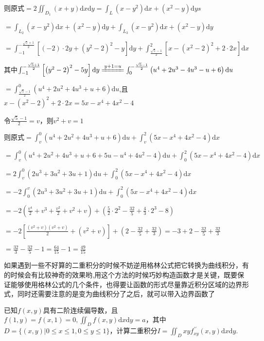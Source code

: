 \begin{xiti}
\begin{solution}
		则原式$=2 \iint_{D_{1}}(x+y) \mathrm{d} x \mathrm{d} y= \int_{L} (x-y^{2}) \mathrm{d} x + (x^{2}-y) \mathrm{d} ys$
		
		$=\int_{L_{2}}\left(x-y^{2}\right) \mathrm{d}x+\left(x^{2}-y\right) \mathrm{d}y+\int_{L_{3}}\left(x-y^{2}\right) \mathrm{d}x+\left(x^{2}-y\right) \mathrm{d}y $
		
		$=\int_{-1}^{-\frac{\sqrt{5}+1}{2}}\left[(-2) \cdot 2 y+\left(y^{2}-2\right)^{2}-y\right] \mathrm{d}y+\int_{\frac{\sqrt{5}-1}{2}}^{2}\left[x-\left(x^{2}-2\right)^{2}+2 \cdot 2 x\right] \mathrm{d}x$
		
		其中$\int_{-1}^{-\frac{\sqrt{5}+1}{2}}\left[\left(y^{2}-2\right)^{2}-5 y\right] \mathrm{d}y \xlongequal{y+1=u} \int_{0}^{-\frac{\sqrt{5}-1}{2}}\left(u^{4}+2 u^{3}-4 u^{3}-u+6\right) \mathrm{d}u$
		
		$=\int_{\frac{\sqrt{5}-1}{2}}^{0}\left(u^{4}+2 u^{2}+4 u^{3}+u+6\right) \mathrm{d}u$,且$x-\left(x^{2}-2\right)^{2}+2 \cdot 2 x=5 x -x^{4}+4x^{2}-4$
		
		令$\frac{\sqrt{5}-1}{2}=v$，则$v^{2}+v=1$
		
		则原式$=\int_{v}^{0}\left(u^{4}+2 u^{2}+4 u^{3}+u+6\right) \mathrm{d}u+\int_{v}^{2}\left(5 x-x^{4}+4 x^{2}-4\right) \mathrm{d}x$
		
		$=\int_{v}^{0}\left(u^{4}+2 u^{2}+4 u^{3}+u+6+5 u-u^{4}+4 u^{2}-4\right) \mathrm{d}u+\int_{0}^{2}\left(5 x-x^{4}+4 x^{2}-4\right) \mathrm{d}x$
		
		$=2 \int_{v}^{0}\left(2 u^{3}+3 u^{2}+3 u+1\right) \mathrm{d}u+\int_{0}^{2}\left(5 x-x^{4}+4 x^{2}-4\right) \mathrm{d}x$
		
		$=-2 \int_{0}^{v}\left(2 u^{3}+3 u^{2}+3 u+1\right) \mathrm{d}u+\int_{0}^{2}\left(5 x-x^{4}+4 x^{2}-4\right) \mathrm{d}x$
		
		$=-2\left(\frac{v^{4}}{2}+v^{3}+\frac{v^{2}}{2}+v^{2}+v\right)+\left(\frac{5}{2} \cdot 2^{2}-\frac{32}{5}+\frac{4}{3} \cdot 2^{3}-8\right)$
		
		$=-2\left[\frac{\left(v^{2}+v\right)\left(v^{2}+v\right)}{2}+\left(v^{2}+v\right)\right]+\left(2-\frac{32}{5}+\frac{32}{3}\right)=-3+2-\frac{32}{5}+\frac{32}{3}$
		
		$=\frac{32}{3}-\frac{32}{5}-1=\frac{64}{15}-1=\frac{49}{15}$
		
		\begin{note}
			如果遇到一些不好算的二重积分的时候不妨逆用格林公式把它转换为曲线积分，有的时候会有比较神奇的效果哟,用这个方法的时候巧妙构造函数才是关键，既要保证能够使用格林公式的几个条件，也得要让函数的形式尽量靠近积分区域的边界形式，同时还需要注意的是变为曲线积分了之后，就可以带入边界函数了
		\end{note}
	\end{solution}
	\item 已知$f(x,y)$具有二阶连续偏导数，且$f(1, y)=f(x, 1)=0,  \iint_{D} f(x, y) \mathrm{d} x \mathrm{d} y=a$，其中$D=\{(x, y) | 0 \leqslant x \leqslant 1,0 \leqslant y \leqslant 1\}$，计算二重积分$I=\iint_{D} x y f_{x y}^{\prime \prime}(x, y) \mathrm{d} x \mathrm{d} y$.
	

\end{xiti}
